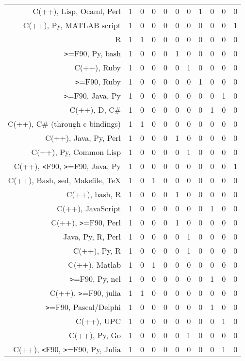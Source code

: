 {\begin{landscape}
\begin{longtable}[htb]{r|c|c|c|c|c|c|c|c|c|c}
{C(++), Lisp, Ocaml, Perl} & 1 & 0 & 0 & 0 & 0 & 0 & 1 & 0 & 0 & 0 \\%
{C(++), Py, MATLAB script} & 1 & 0 & 0 & 0 & 0 & 0 & 0 & 0 & 0 & 1 \\%
{R} & 1 & 1 & 0 & 0 & 0 & 0 & 0 & 0 & 0 & 0 \\%
{\verb!>!=F90, Py, bash} & 1 & 0 & 0 & 0 & 1 & 0 & 0 & 0 & 0 & 0 \\%
{C(++), Ruby} & 1 & 0 & 0 & 0 & 0 & 1 & 0 & 0 & 0 & 0 \\%
{\verb!>!=F90, Ruby} & 1 & 0 & 0 & 0 & 0 & 0 & 1 & 0 & 0 & 0 \\%
{\verb!>!=F90, Java, Py} & 1 & 0 & 0 & 0 & 0 & 0 & 0 & 0 & 1 & 0 \\%
{C(++), D, C\#} & 1 & 0 & 0 & 0 & 0 & 0 & 0 & 1 & 0 & 0 \\%
{C(++), C\# (through c bindings)} & 1 & 1 & 0 & 0 & 0 & 0 & 0 & 0 & 0 & 0 \\%
{C(++), Java, Py, Perl} & 1 & 0 & 0 & 0 & 1 & 0 & 0 & 0 & 0 & 0 \\%
{C(++), Py, Common Lisp} & 1 & 0 & 0 & 0 & 0 & 1 & 0 & 0 & 0 & 0 \\%
{C(++), \verb!<!F90, \verb!>!=F90, Java, Py} & 1 & 0 & 0 & 0 & 0 & 0 & 0 & 0 & 0 & 1 \\%
{C(++), Bash, sed, Makefile, TeX} & 1 & 0 & 1 & 0 & 0 & 0 & 0 & 0 & 0 & 0 \\%
{C(++), bash, R} & 1 & 0 & 0 & 0 & 1 & 0 & 0 & 0 & 0 & 0 \\%
{C(++), JavaScript} & 1 & 0 & 0 & 0 & 0 & 0 & 0 & 1 & 0 & 0 \\%
{C(++), \verb!>!=F90, Perl} & 1 & 0 & 0 & 0 & 1 & 0 & 0 & 0 & 0 & 0 \\%
{Java, Py, R, Perl} & 1 & 0 & 0 & 0 & 0 & 1 & 0 & 0 & 0 & 0 \\%
{C(++), Py, R} & 1 & 0 & 0 & 0 & 0 & 1 & 0 & 0 & 0 & 0 \\%
{C(++), Matlab} & 1 & 0 & 1 & 0 & 0 & 0 & 0 & 0 & 0 & 0 \\%
{\verb!>!=F90, Py, ncl} & 1 & 0 & 0 & 0 & 0 & 0 & 0 & 1 & 0 & 0 \\%
{C(++), \verb!>!=F90, julia} & 1 & 1 & 0 & 0 & 0 & 0 & 0 & 0 & 0 & 0 \\%
{\verb!>!=F90, Pascal/Delphi} & 1 & 0 & 0 & 0 & 0 & 0 & 0 & 1 & 0 & 0 \\%
{C(++), UPC} & 1 & 0 & 0 & 0 & 0 & 0 & 0 & 0 & 1 & 0 \\%
{C(++), Py, Go} & 1 & 0 & 0 & 0 & 0 & 1 & 0 & 0 & 0 & 0 \\%
{C(++), \verb!<!F90, \verb!>!=F90, Py, Julia} & 1 & 0 & 0 & 0 & 0 & 0 & 0 & 0 & 1 & 0 \\%

\end{longtable}
\end{landscape}}
